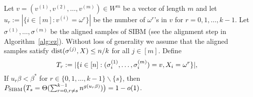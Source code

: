 \documentclass{article}
\begin{document}
\begin{lemma}  \label{lm:cvs}
	Let $v=(v^{(1)},v^{(2)},\dots,v^{(m)})\in W^m$ be a vector of length $m$ and let $u_r:=|\{i\in[m]:v^{(i)}=\omega^r\}|$ be the number of $\omega^r$'s in $v$ for $r=0,1,\dots, k-1$.
	Let $\sigma^{(1)},\dots,\sigma^{(m)}$ be the aligned samples of SIBM (see the alignment step in Algorithm~\ref{alg:ez}).
	Without loss of generality we assume that the aligned samples satisfy  $\operatorname{dist}(\sigma^{(j)}, X) \le n/k$ for all $j\in[m]$.
	Define 
	\begin{equation}  \label{eq:rl}
	T_r:= | \{i\in[n]:(\sigma_i^{(1)},\dots,\sigma_i^{(m)})=v, X_i=\omega^r \} | ,  \\
	\end{equation}
	If $u_r\beta<\beta^\ast$ for $r\in \{0,1, \dots, k-1 \} \backslash \{s\}$, then $P_{\operatorname{SIBM}}\big(T_s = \Theta(\sum_{r=0, r\neq s}^{k-1}n^{g(u_r\beta)}) \big) = 1-o(1)$.
\end{lemma}
\end{document}
